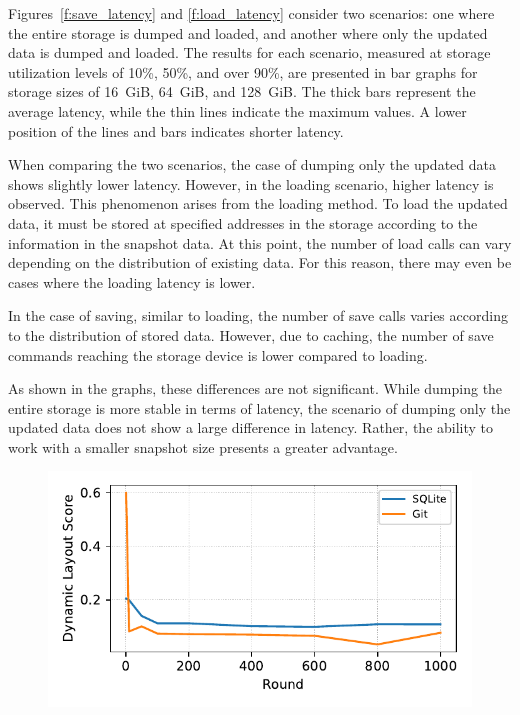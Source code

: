 Figures~\ref{f:save_latency} and \ref{f:load_latency} consider two scenarios: one where the entire storage is dumped and loaded, and another where only the updated data is dumped and loaded.
The results for each scenario, measured at storage utilization levels of 10\%, 50\%, and over 90\%, are presented in bar graphs for storage sizes of 16~GiB, 64~GiB, and 128~GiB.
The thick bars represent the average latency, while the thin lines indicate the maximum values.
A lower position of the lines and bars indicates shorter latency.

When comparing the two scenarios, the case of dumping only the updated data shows slightly lower latency.
However, in the loading scenario, higher latency is observed. This phenomenon arises from the loading method.
To load the updated data, it must be stored at specified addresses in the storage according to the information in the snapshot data.
At this point, the number of load calls can vary depending on the distribution of existing data.
For this reason, there may even be cases where the loading latency is lower.

In the case of saving, similar to loading, the number of save calls varies according to the distribution of stored data.
However, due to caching, the number of save commands reaching the storage device is lower compared to loading.

As shown in the graphs, these differences are not significant.
While dumping the entire storage is more stable in terms of latency, the scenario of dumping only the updated data does not show a large difference in latency.
Rather, the ability to work with a smaller snapshot size presents a greater advantage.


\begin{figure}[t]
    \centering
    \includegraphics[width=0.95\columnwidth]{graphs/py_graph/dynamic}
    \caption{}
    \label{f:dynamic}
\end{figure}

